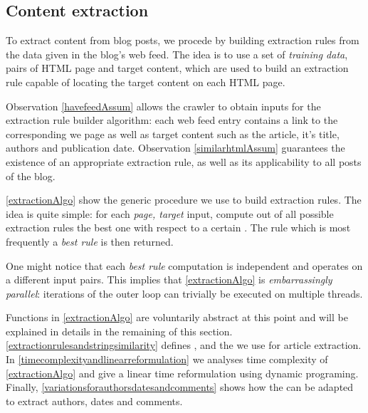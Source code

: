 \subsection{Content extraction}
\label{contentextraction}

To extract content from blog posts, we procede by building extraction rules from the data given in the blog's web feed. The idea is to use a set of \emph{training data}, pairs of HTML page and target content, which are used to build an extraction rule capable of locating the target content on each HTML page.

Observation \ref{havefeedAssum} allows the crawler to obtain inputs for the extraction rule builder algorithm: each web feed entry contains a link to the corresponding we page as well as target content such as the article, it's title, authors and publication date. Observation \ref{similarhtmlAssum} guarantees the existence of an appropriate extraction rule, as well as its applicability to all posts of the blog.

\autoref{extractionAlgo} show the generic procedure we use to build extraction rules. The idea is quite simple: for each \code{(}\emph{page, target}\code{)} input, compute out of all possible extraction rules the best one with respect to a certain . The rule which is most frequently a \emph{best rule} is then returned.

\extractionAlgo

One might notice that each \emph{best rule} computation is independent and operates on a different input pairs. This implies that \autoref{extractionAlgo} is \emph{embarrassingly parallel}: iterations of the outer loop can trivially be executed on multiple threads.

Functions in \autoref{extractionAlgo} are voluntarily abstract at this point and will be explained in details in the remaining of this section. \ref{extractionrulesandstringsimilarity} defines ,  and the  we use for article extraction. In \ref{timecomplexityandlinearreformulation} we analyses time complexity of \autoref{extractionAlgo} and give a linear time reformulation using dynamic programing. Finally, \ref{variationsforauthorsdatesandcomments} shows how the  can be adapted to extract authors, dates and comments.

